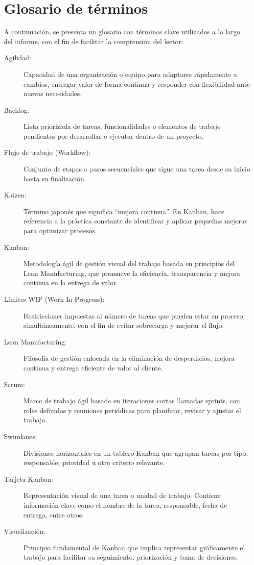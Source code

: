 \section*{Glosario de términos}

A continuación, se presenta un glosario con términos clave utilizados a lo largo del informe, con el fin de facilitar la comprensión del lector:

\begin{description}
    \item[Agilidad:] Capacidad de una organización o equipo para adaptarse rápidamente a cambios, entregar valor de forma continua y responder con flexibilidad ante nuevas necesidades.
    
    \item[Backlog:] Lista priorizada de tareas, funcionalidades o elementos de trabajo pendientes por desarrollar o ejecutar dentro de un proyecto.
    
    \item[Flujo de trabajo (Workflow):] Conjunto de etapas o pasos secuenciales que sigue una tarea desde su inicio hasta su finalización.
    
    \item[Kaizen:] Término japonés que significa “mejora continua”. En Kanban, hace referencia a la práctica constante de identificar y aplicar pequeñas mejoras para optimizar procesos.
    
    \item[Kanban:] Metodología ágil de gestión visual del trabajo basada en principios del Lean Manufacturing, que promueve la eficiencia, transparencia y mejora continua en la entrega de valor.
    
    \item[Límites WIP (Work In Progress):] Restricciones impuestas al número de tareas que pueden estar en proceso simultáneamente, con el fin de evitar sobrecarga y mejorar el flujo.
    
    \item[Lean Manufacturing:] Filosofía de gestión enfocada en la eliminación de desperdicios, mejora continua y entrega eficiente de valor al cliente.
    
    \item[Scrum:] Marco de trabajo ágil basado en iteraciones cortas llamadas sprints, con roles definidos y reuniones periódicas para planificar, revisar y ajustar el trabajo.
    
    \item[Swimlanes:] Divisiones horizontales en un tablero Kanban que agrupan tareas por tipo, responsable, prioridad u otro criterio relevante.
    
    \item[Tarjeta Kanban:] Representación visual de una tarea o unidad de trabajo. Contiene información clave como el nombre de la tarea, responsable, fecha de entrega, entre otros.
    
    \item[Visualización:] Principio fundamental de Kanban que implica representar gráficamente el trabajo para facilitar su seguimiento, priorización y toma de decisiones.
\end{description}

\vspace{0.5cm}
